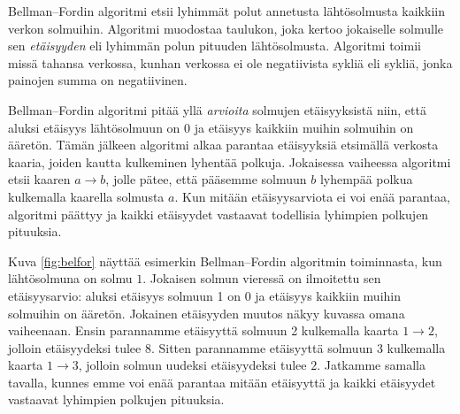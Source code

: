 Bellman–Fordin algoritmi etsii lyhimmät polut
annetusta lähtösolmusta kaikkiin verkon solmuihin.
Algoritmi muodostaa taulukon, joka kertoo jokaiselle
solmulle sen \emph{etäisyyden} eli lyhimmän polun pituuden lähtösolmusta.
Algoritmi toimii missä tahansa verkossa,
kunhan verkossa ei ole negatiivista sykliä eli sykliä,
jonka painojen summa on negatiivinen.

Bellman–Fordin algoritmi pitää yllä \emph{arvioita}
solmujen etäisyyksistä niin,
että aluksi etäisyys lähtösolmuun on 0 ja etäisyys
kaikkiin muihin solmuihin on ääretön.
Tämän jälkeen algoritmi alkaa parantaa etäisyyksiä
etsimällä verkosta kaaria, joiden kautta kulkeminen
lyhentää polkuja.
Jokaisessa vaiheessa algoritmi etsii kaaren $a \rightarrow b$,
jolle pätee, että pääsemme solmuun $b$ lyhempää polkua
kulkemalla kaarella solmusta $a$.
Kun mitään etäisyysarviota ei voi enää parantaa,
algoritmi päättyy ja kaikki etäisyydet vastaavat
todellisia lyhimpien polkujen pituuksia.

Kuva \ref{fig:belfor} näyttää esimerkin Bellman–Fordin algoritmin toiminnasta,
kun lähtösolmuna on solmu $1$.
Jokaisen solmun vieressä on ilmoitettu sen etäisyysarvio:
aluksi etäisyys solmuun 1 on 0 ja etäisyys kaikkiin muihin solmuihin on ääretön.
Jokainen etäisyyden muutos näkyy kuvassa omana vaiheenaan.
Ensin parannamme etäisyyttä solmuun 2
kulkemalla kaarta $1 \rightarrow 2$,
jolloin etäisyydeksi tulee $8$.
Sitten parannamme etäisyyttä solmuun $3$
kulkemalla kaarta $1 \rightarrow 3$,
jolloin solmun uudeksi etäisyydeksi tulee $2$.
Jatkamme samalla tavalla, kunnes emme voi enää parantaa
mitään etäisyyttä ja kaikki etäisyydet
vastaavat lyhimpien polkujen pituuksia.

